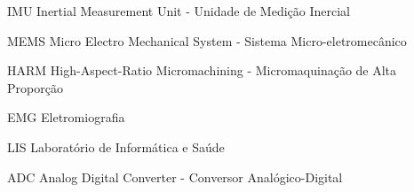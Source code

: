 \begin{siglas}
   \item[IMU] Inertial Measurement Unit - Unidade de Medição Inercial
   \item[MEMS]  Micro Electro Mechanical System - Sistema Micro-eletromecânico
   \item[HARM] High-Aspect-Ratio Micromachining - Micromaquinação de Alta Proporção 
   \item[EMG] Eletromiografia
   \item[LIS] Laboratório de Informática e Saúde
   \item[ADC] Analog Digital Converter - Conversor Analógico-Digital
   
 
\end{siglas}
